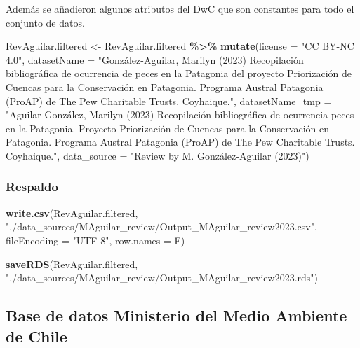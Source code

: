\documentclass[sn-apa,pdflatex]{sn-jnl}
\newenvironment{Shaded}{\begin{snugshade}}{\end{snugshade}}
\newcommand{\AttributeTok}[1]{\textcolor[rgb]{0.13,0.29,0.53}{#1}}
\newcommand{\FunctionTok}[1]{\textcolor[rgb]{0.13,0.29,0.53}{\textbf{#1}}}
\newcommand{\NormalTok}[1]{#1}
\newcommand{\OtherTok}[1]{\textcolor[rgb]{0.56,0.35,0.01}{#1}}
\newcommand{\SpecialCharTok}[1]{\textcolor[rgb]{0.81,0.36,0.00}{\textbf{#1}}}
\newcommand{\StringTok}[1]{\textcolor[rgb]{0.31,0.60,0.02}{#1}}
\begin{document}
Además se añadieron algunos atributos del DwC que son constantes para
todo el conjunto de datos.

\begin{Shaded}
\begin{Highlighting}[]
\NormalTok{RevAguilar.filtered }\OtherTok{\textless{}{-}}\NormalTok{ RevAguilar.filtered }\SpecialCharTok{\%\textgreater{}\%}
    \FunctionTok{mutate}\NormalTok{(}\AttributeTok{license =} \StringTok{"CC BY{-}NC 4.0"}\NormalTok{, }\AttributeTok{datasetName =} \StringTok{"González{-}Aguilar, Marilyn (2023) Recopilación bibliográfica de ocurrencia de peces en la Patagonia del proyecto Priorización de Cuencas para la Conservación en Patagonia. Programa Austral Patagonia (ProAP) de The Pew Charitable Trusts. Coyhaique."}\NormalTok{,}
        \AttributeTok{datasetName\_tmp =} \StringTok{"Aguilar{-}González, Marilyn (2023) Recopilación bibliográfica de ocurrencia peces en la Patagonia. Proyecto Priorización de Cuencas para la Conservación en Patagonia. Programa Austral Patagonia (ProAP) de The Pew Charitable Trusts. Coyhaique."}\NormalTok{,}
        \AttributeTok{data\_source =} \StringTok{"Review by M. González{-}Aguilar (2023)"}\NormalTok{)}
\end{Highlighting}
\end{Shaded}

\subsubsection{Respaldo}\label{respaldo-2}

\begin{Shaded}
\begin{Highlighting}[]
\FunctionTok{write.csv}\NormalTok{(RevAguilar.filtered, }\StringTok{"./data\_sources/MAguilar\_review/Output\_MAguilar\_review2023.csv"}\NormalTok{,}
    \AttributeTok{fileEncoding =} \StringTok{"UTF{-}8"}\NormalTok{, }\AttributeTok{row.names =}\NormalTok{ F)}

\FunctionTok{saveRDS}\NormalTok{(RevAguilar.filtered, }\StringTok{"./data\_sources/MAguilar\_review/Output\_MAguilar\_review2023.rds"}\NormalTok{)}
\end{Highlighting}
\end{Shaded}

\subsection{Base de datos Ministerio del Medio Ambiente de
Chile}\label{base-de-datos-ministerio-del-medio-ambiente-de-chile}
\end{document}

